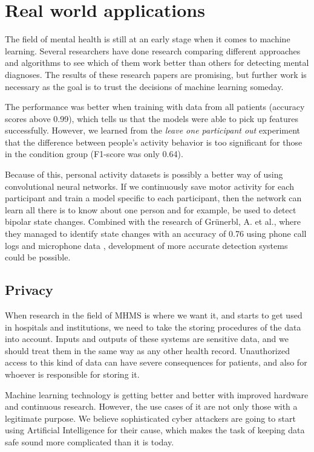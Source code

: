 \section{Real world applications}

The field of mental health is still at an early stage when it comes to machine learning. Several researchers have done research comparing different approaches and algorithms to see which of them work better than others for detecting mental diagnoses. The results of these research papers are promising, but further work is necessary as the goal is to trust the decisions of machine learning someday. 

The performance was better when training with data from all patients (accuracy scores above 0.99), which tells us that the models were able to pick up features successfully. However, we learned from the \textit{leave one participant out} experiment that the difference between people's activity behavior is too significant for those in the condition group (F1-score was only 0.64). 

Because of this, personal activity datasets is possibly a better way of using convolutional neural networks. If we continuously save motor activity for each participant and train a model specific to each participant, then the network can learn all there is to know about one person and for example, be used to detect bipolar state changes. Combined with the research of Grünerbl, A. et al., where they managed to identify state changes with an accuracy of 0.76 using phone call logs and microphone data \cite{grunerbl_smartphone_bipolar}, development of more accurate detection systems could be possible.

\subsection{Privacy}
When research in the field of MHMS is where we want it, and starts to get used in hospitals and institutions, we need to take the storing procedures of the data into account. Inputs and outputs of these systems are sensitive data, and we should treat them in the same way as any other health record. Unauthorized access to this kind of data can have severe consequences for patients, and also for whoever is responsible for storing it. 

Machine learning technology is getting better and better with improved hardware and continuous research. However, the use cases of it are not only those with a legitimate purpose. We believe sophisticated cyber attackers are going to start using Artificial Intelligence for their cause, which makes the task of keeping data safe sound more complicated than it is today.

